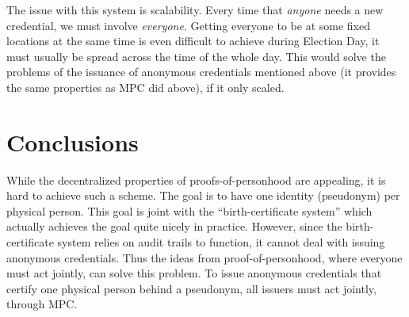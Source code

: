 The issue with this system is scalability.
Every time that \emph{anyone} needs a new credential, we must involve 
\emph{everyone}.
Getting everyone to be at some fixed locations at the same time is even 
difficult to achieve during Election Day, it must usually be spread across the 
time of the whole day.
This would solve the problems of the issuance of anonymous credentials 
mentioned above (it provides the same properties as \ac{MPC} did above), if it 
only scaled.


\section{Conclusions}

While the decentralized properties of proofs-of-personhood are appealing, it is 
hard to achieve such a scheme.
The goal is to have one identity (pseudonym) per physical person.
This goal is joint with the \enquote{birth-certificate system} which actually 
achieves the goal quite nicely in practice.
However, since the birth-certificate system relies on audit trails to function, 
it cannot deal with issuing anonymous credentials.
Thus the ideas from proof-of-personhood, where everyone must act jointly, can 
solve this problem.
To issue anonymous credentials that certify one physical person behind a 
pseudonym, all issuers must act jointly, \eg through \ac{MPC}.
